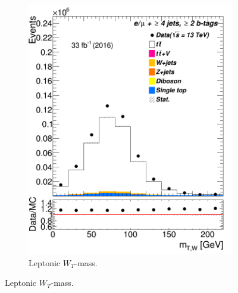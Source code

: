 \begin{figure} [b]
	
\begin{subfigure}{0.25\textwidth}
	\includegraphics[width=\linewidth]{ControlPlots_emujets_2016_4incl_2incl/mtw_emujets_2016.png}
	\caption{Leptonic  $W_T$-mass.} \label{fig:Sec4}
\end{subfigure}
\hspace*{0.5cm}

\end{figure}

